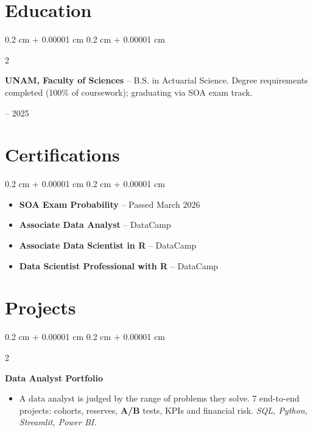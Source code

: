 \documentclass[10pt, letterpaper]{article}
\newenvironment{highlights}{
    \begin{itemize}[
        topsep=0.05 cm,
        parsep=0.05 cm,
        partopsep=0pt,
        itemsep=0pt,
        leftmargin=0.4 cm + 10pt
    ]
}{
    \end{itemize}
}
\newenvironment{highlightsforbulletentries}{
    \begin{itemize}[
        topsep=0.02 cm,
        parsep=0.05 cm,
        partopsep=0pt,
        itemsep=0pt,
        leftmargin=10pt
    ]
}{
    \end{itemize}
}
\newenvironment{onecolentry}{
    \begin{adjustwidth}{
        0.2 cm + 0.00001 cm
    }{
        0.2 cm + 0.00001 cm
    }
}{
    \end{adjustwidth}
}
\newenvironment{twocolentry}[2][]{
    \onecolentry
    \def\secondColumn{#2}
    \setcolumnwidth{\fill, 4.0 cm}
    \begin{paracol}{2}
}{
    \switchcolumn \raggedleft \secondColumn
    \end{paracol}
    \endonecolentry
}
\newenvironment{twocolentrynarrow}[2][]{
    \onecolentry
    \def\secondColumn{#2}
    \setcolumnwidth{\fill, 2.2 cm}
    \begin{paracol}{2}
}{
    \switchcolumn \raggedleft \secondColumn
    \end{paracol}
    \endonecolentry
}
\newcommand{\hl}[1]{\textcolor{primaryColor}{\textbf{#1}}}
\let\hrefWithoutArrow\href
\renewcommand{\href}[2]{\hrefWithoutArrow{#1}{\ifthenelse{\equal{#2}{}}{ }{#2 }\raisebox{.15ex}{\footnotesize \faExternalLink*}}}
\begin{document}
    \section{Education}

        \begin{twocolentry}{2021 -- 2025}
            \textbf{UNAM, Faculty of Sciences} -- B.S. in Actuarial Science. Degree requirements completed (100\% of coursework); graduating via SOA exam track.
        \end{twocolentry}

    \section{Certifications}

    \begin{onecolentry}
        \begin{highlightsforbulletentries}
            \item \textbf{SOA Exam Probability} -- Passed March 2026 \href{https://drive.google.com/file/d/1rt3emgBnPpQi7NiXkBQeA5WwJTV0JuAf/view?usp=sharing}{}
            \item \textbf{Associate Data Analyst} -- DataCamp \href{https://drive.google.com/drive/folders/1-QUuVH3zPBPsl6RhUvuUWxpZkP1i8TYb?usp=sharing}{}
            \item \textbf{Associate Data Scientist in R} -- DataCamp \href{https://drive.google.com/file/d/1xVLk15A1LBbyXH1fZnd4eBTaJ4d8FLLO/view?usp=drive_link}{}
            \item \textbf{Data Scientist Professional with R} -- DataCamp \href{https://drive.google.com/file/d/1Woe6xqxofloFZ9uM2f5VsdGxY-WQWCRI/view?usp=drive_link}{}
        \end{highlightsforbulletentries}
    \end{onecolentry}


    \section{Projects}

\begin{twocolentrynarrow}{\href{https://demo-aesthetics.vercel.app/}{app live}}
    \textbf{Data Analyst Portfolio}
    \begin{highlights}
        \item A data analyst is judged by the range of problems they solve. 7 end-to-end projects: cohorts, reserves, \hl{A/B} tests, KPIs and financial risk. \textit{SQL, Python, Streamlit, Power BI.}
    \end{highlights}
\end{twocolentrynarrow}
\end{document}
